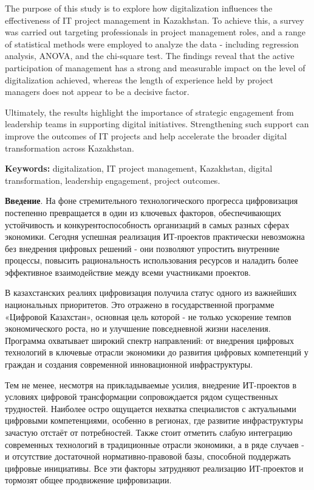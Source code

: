 The purpose of this study is to explore how digitalization influences
the effectiveness of IT project management in Kazakhstan. To achieve
this, a survey was carried out targeting professionals in project
management roles, and a range of statistical methods were employed to
analyze the data - including regression analysis, ANOVA, and the
chi-square test. The findings reveal that the active participation of
management has a strong and measurable impact on the level of
digitalization achieved, whereas the length of experience held by
project managers does not appear to be a decisive factor.

Ultimately, the results highlight the importance of strategic engagement
from leadership teams in supporting digital initiatives. Strengthening
such support can improve the outcomes of IT projects and help accelerate
the broader digital transformation across Kazakhstan.

{\bfseries Keywords:} digitalization, IT project management, Kazakhstan,
digital transformation, leadership engagement, project outcomes.

{\bfseries Введение}. На фоне стремительного технологического прогресса
цифровизация постепенно превращается в один из ключевых факторов,
обеспечивающих устойчивость и конкурентоспособность организаций в самых
разных сферах экономики. Сегодня успешная реализация ИТ-проектов
практически невозможна без внедрения цифровых решений - они позволяют
упростить внутренние процессы, повысить рациональность использования
ресурсов и наладить более эффективное взаимодействие между всеми
участниками проектов.

В казахстанских реалиях цифровизация получила статус одного из важнейших
национальных приоритетов. Это отражено в государственной программе
«Цифровой Казахстан», основная цель которой - не только ускорение темпов
экономического роста, но и улучшение повседневной жизни населения.
Программа охватывает широкий спектр направлений: от внедрения цифровых
технологий в ключевые отрасли экономики до развития цифровых компетенций
у граждан и создания современной инновационной инфраструктуры.

Тем не менее, несмотря на прикладываемые усилия, внедрение ИТ-проектов в
условиях цифровой трансформации сопровождается рядом существенных
трудностей. Наиболее остро ощущается нехватка специалистов с актуальными
цифровыми компетенциями, особенно в регионах, где развитие
инфраструктуры зачастую отстаёт от потребностей. Также стоит отметить
слабую интеграцию современных технологий в традиционные отрасли
экономики, а в ряде случаев - и отсутствие достаточной
нормативно-правовой базы, способной поддержать цифровые инициативы. Все
эти факторы затрудняют реализацию ИТ-проектов и тормозят общее
продвижение цифровизации.

